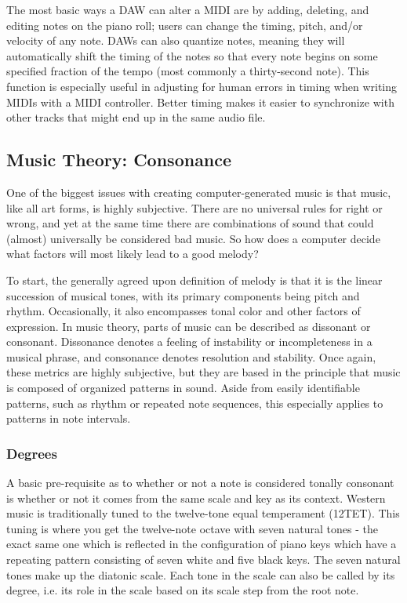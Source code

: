 The most basic ways a DAW can alter a MIDI are by adding, deleting, and editing notes on
the piano roll; users can change the timing, pitch, and/or velocity of any note. DAWs can
also quantize notes, meaning they will automatically shift the timing of the notes so that
every note begins on some specified fraction of the tempo (most commonly a thirty-second
note). This function is especially useful in adjusting for human errors in timing when
writing MIDIs with a MIDI controller. Better timing makes it easier to synchronize with
other tracks that might end up in the same audio file.

\subsection{Music Theory: Consonance}

One of the biggest issues with creating computer-generated music is that music, like all art
forms, is highly subjective. There are no universal rules for right or wrong, and yet at the
same time there are combinations of sound that could (almost) universally be considered bad music.
So how does a computer decide what factors will most likely lead to a good melody?

To start, the generally agreed upon definition of melody is that it is the linear succession
of musical tones, with its primary components being pitch and rhythm. Occasionally, it also
encompasses tonal color and other factors of expression.\autocite{melody} In music theory, parts
of music can be described as dissonant or consonant. Dissonance denotes a feeling of instability or
incompleteness in a musical phrase, and consonance denotes resolution and stability. Once again,
these metrics are highly subjective, but they are based in the principle that music is composed
of organized patterns in sound.\autocite{musiciansArithmetic} Aside from easily identifiable
patterns, such as rhythm or repeated note sequences, this especially applies to patterns in note
intervals.

\subsubsection{Degrees}

A basic pre-requisite as to whether or not a note is considered tonally consonant is whether or
not it comes from the same scale and key as its context. Western music is traditionally tuned to
the twelve-tone equal temperament (12TET). This tuning is where you get the twelve-note octave
with seven natural tones - the exact same one which is reflected in the configuration of piano keys
which have a repeating pattern consisting of seven white and five black keys. The seven natural
tones make up the diatonic scale. Each tone in the scale can also be called by its degree, i.e.
its role in the scale based on its scale step from the root note.

